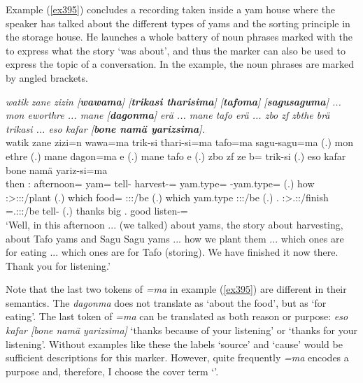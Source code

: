 Example (\ref{ex395}) concludes a recording taken inside a yam house where the speaker has talked about the different types of yams and the sorting principle in the storage house. He launches a whole battery of noun phrases marked with the   to express what the story `was about', and thus the  marker can also be used to express the topic of a conversation. In the example, the noun phrases are marked by angled brackets.

\begin{exe}
	\ex \emph{watik zane zizin [\textbf{wawama}] [\textbf{trikasi tharisima}] [\textbf{tafoma}] [\textbf{sagusaguma}] ... mon eworthre ... mane [\textbf{dagonma}] erä ... mane tafo erä ... zbo zf zbthe brä trikasi ... eso kafar [\textbf{bone namä yarizsima}].}\\
	\gll watik zane zizi=n wawa=ma trik-si thari-si=ma tafo=ma sagu-sagu=ma (.) mon ethre (.) mane dagon=ma e (.) mane tafo e (.) zbo zf ze b= trik-si (.) eso kafar bone namä yariz-si=ma\\
	then \Dem:\Prox{} afternoon=\Loc{} yam=\Char{} tell-\Nmlz{} harvest-\Nmlz=\Char{} yam.type=\Char{} \Redup-yam.type=\Char{} (.) how \Fpl:\Sbj>\Stpl:\Obj:\Nonpast:\Ipfv/plant (.) which food=\Char{} \Stpl:\Sbj:\Nonpast:\Ipfv/be (.) which yam.type \Stpl:\Sbj:\Nonpast:\Ipfv/be (.) \Prox.\All{} \Imm{} \Fdu:\Sbj>\Tsg.\F:\Rpst:\Pfv/finish \Med=\Tsg.\F:\Sbj:\Nonpast:\Ipfv/be tell-\Nmlz{} (.) thanks big \Ssg.\Poss{} good listen-\Nmlz=\Char{}\\
	\trans `Well, in this afternoon ... (we talked) about yams, the story about harvesting, about Tafo yams and Sagu Sagu yams ... how we plant them ... which ones are for eating ... which ones are for Tafo (storing). We have finished it now there. Thank you for listening.'
	\label{ex395}
\end{exe}

Note that the last two tokens of \emph{=ma} in example (\ref{ex395}) are different in their semantics. The  \emph{dagonma} does not translate as `about the food', but as `for eating'. The last token of \emph{=ma} can be translated as both reason or purpose: \emph{eso kafar [bone namä yarizsima]} `thanks because of your listening' or `thanks for your listening'. Without examples like these the labels `source' and `cause' would be sufficient descriptions for this  marker. However, quite frequently \emph{=ma} encodes a purpose and, therefore, I choose the cover term `'.\\ 

